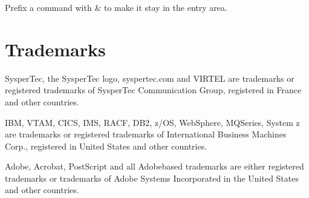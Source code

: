 \documentclass[letterpaper,10pt,english]{sphinxmanual}
\begin{document}
\sphinxAtStartPar
{}

\begin{sphinxVerbatim}[commandchars=\\\{\}]
                         
                         
\end{sphinxVerbatim}

\sphinxAtStartPar
{}

\sphinxAtStartPar
Prefix a command with \& to make it stay in the entry area.

\sphinxAtStartPar
{}

\begin{sphinxVerbatim}[commandchars=\\\{\}]
                         
                        
                          
                          
                           
\end{sphinxVerbatim}


\section{Trademarks}
\label{\detokenize{Installation_Guide:trademarks}}
\sphinxAtStartPar
SysperTec, the SysperTec logo, syspertec.com and VIRTEL are trademarks or registered trademarks of SysperTec
Communication Group, registered in France and other countries.

\sphinxAtStartPar
IBM, VTAM, CICS, IMS, RACF, DB2, z/OS, WebSphere, MQSeries, System z are trademarks or registered trademarks of
International Business Machines Corp., registered in United States and other countries.

\sphinxAtStartPar
Adobe, Acrobat, PostScript and all Adobe\sphinxhyphen{}based trademarks are either registered trademarks or trademarks of Adobe
Systems Incorporated in the United States and other countries.
\end{document}
